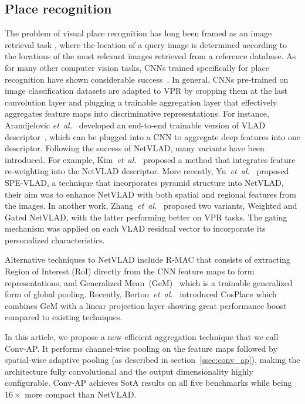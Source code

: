 \documentclass{article}
\newcommand{\etal}{\textit{et~al.}}
\begin{document}
\subsection{Place recognition}
The problem of visual place recognition has long been framed as an image retrieval task \cite{arandjelovic2016netvlad, kim2017learned, liu2019stochastic, seymour2019semantically, ge2020self}, where the location of a query image is determined according to the locations of the most relevant images retrieved from a reference database. As for many other computer vision tasks, CNNs trained specifically for place recognition have shown considerable success~\cite{chen2017deep, wang2018omnidirectional, yin2019multi, arandjelovic2016netvlad, ge2020self}. In general, CNNs pre-trained on image classification datasets are adapted to VPR by cropping them at the last convolution layer and plugging a trainable aggregation layer that effectively aggregates feature maps into discriminative representations. 
For instance, Arandjelovic \etal~\cite{arandjelovic2016netvlad} developed an end-to-end trainable version of VLAD descriptor~\cite{arandjelovic2013all}, which can be plugged into a CNN to aggregate deep features into one descriptor. Following the success of NetVLAD, many variants have been introduced. For example, Kim~\etal~\cite{kim2017learned} proposed a method that integrates feature re-weighting into the NetVLAD descriptor. More recently, Yu~\etal~\cite{yu2019spatial} proposed SPE-VLAD, a technique that incorporates pyramid structure into NetVLAD, their aim was to enhance NetVLAD with both spatial and regional features from the images. In another work, Zhang~\etal~\cite{zhang2021vector} proposed two variants, Weighted and Gated NetVLAD, with the latter performing better on VPR tasks. The gating mechanism was applied on each VLAD residual vector to incorporate its personalized characteristics.

Alternative techniques to NetVLAD include R-MAC \cite{tolias2015particular} that consists of extracting Region of Interest (RoI) directly from the CNN feature maps to form representations, and Generalized Mean~(GeM)~\cite{radenovic2018fine} which is a trainable generalized form of global pooling. Recently, Berton~\etal~\cite{berton2022rethinking} introduced CosPlace which combines GeM with a linear projection layer showing great performance boost compared to existing techniques.

In this article, we propose a new efficient aggregation technique that we call Conv-AP. It performs channel-wise pooling on the feature maps followed by spatial-wise adaptive pooling (as described in section~\ref{ssec:conv_ap}), making the architecture fully convolutional and the output dimensionality highly configurable. Conv-AP achieves SotA results on all five benchmarks while being~$16\times$ more compact than NetVLAD.
\end{document}
